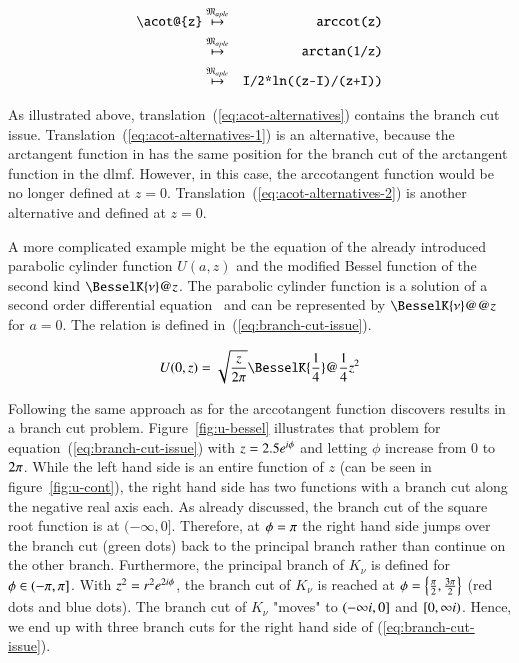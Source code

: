 \begin{eqnarray}
\verb|\acot@{z}| & \overset{\langMaple}{\mapsto} & \verb|arccot(z)|\label{eq:acot-alternatives}\\
& \overset{\langMaple}{\mapsto} & \verb|arctan(1/z)|\label{eq:acot-alternatives-1}\\
& \overset{\langMaple}{\mapsto} & \verb|I/2*ln((z-I)/(z+I))|\label{eq:acot-alternatives-2}
\end{eqnarray}

As illustrated above, translation~(\ref{eq:acot-alternatives}) contains the branch cut issue. Translation~(\ref{eq:acot-alternatives-1}) is an alternative, because the arctangent function in \Maple{} has the same position for the branch cut of the arctangent function in the \gls{dlmf}. However, in this case, the arccotangent function would be no longer defined at $z=0$. Translation~(\ref{eq:acot-alternatives-2}) is another alternative and defined at $z=0$. 

A more complicated example might be the equation of the already introduced parabolic cylinder function $U(a,z)$ and the modified Bessel function of the second kind $\BesselK{\nu}@{z}$. The parabolic cylinder function is a solution of a second order differential equation~\parencite[(12.2i)]{NIST:DLMF} and can be represented by $\BesselK{\nu}@@{z}$ for $a=0$. The relation is defined in~(\ref{eq:branch-cut-issue}). 

\begin{equation}\label{eq:branch-cut-issue}
\displaystyle U(0,z) = \sqrt{\frac{z}{2\cpi}}\BesselK{\frac{1}{4}}@{\frac{1}{4}z^2}
\end{equation}

Following the same approach as for the arccotangent function discovers results in a branch cut problem. Figure~\ref{fig:u-bessel} illustrates that problem for equation~(\ref{eq:branch-cut-issue}) with $z=2.5{e}^{{i}\phi}$ and letting $\phi$ increase from $0$ to $2{\pi}$. While the left hand side is an entire function of $z$ (can be seen in figure~\ref{fig:u-cont}), the right hand side has two functions with a branch cut along the negative real axis each. As already discussed, the branch cut of the square root function is at $(-\infty,0]$. Therefore, at $\phi = {\pi}$ the right hand side jumps over the branch cut (green dots) back to the principal branch rather than continue on the other branch. Furthermore, the principal branch of $K_\nu$ is defined for $\phi \in (-{\pi},{\pi}]$. With $z^2 = r^2{e}^{2{i}\phi}$, the branch cut of $K_\nu$ is reached at $\phi = \left\{ \frac{{\pi}}{2}, \frac{3{\pi}}{2} \right\}$ (red dots and blue dots). The branch cut of $K_\nu$ "moves" to $(-\infty{i},0]$ and $[0,\infty{i})$. Hence, we end up with three branch cuts for the right hand side of (\ref{eq:branch-cut-issue}).

